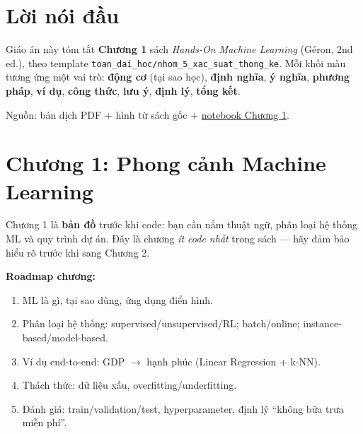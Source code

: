\documentclass[12pt,a4paper]{article}
\begin{document}

\newpage
\tableofcontents
\newpage

\section*{Lời nói đầu}

\begin{ynghia}[title={Cách đọc tài liệu}]
Giáo án này tóm tắt \textbf{Chương 1} sách \emph{Hands-On Machine Learning} (Géron, 2nd ed.), theo template \texttt{toan\_dai\_hoc/nhom\_5\_xac\_suat\_thong\_ke}. Mỗi khối màu tương ứng một vai trò: \textbf{động cơ} (tại sao học), \textbf{định nghĩa}, \textbf{ý nghĩa}, \textbf{phương pháp}, \textbf{ví dụ}, \textbf{công thức}, \textbf{lưu ý}, \textbf{định lý}, \textbf{tổng kết}.

Nguồn: bản dịch PDF + hình từ sách gốc + \href{https://github.com/ageron/handson-ml2/blob/master/01_the_machine_learning_landscape.ipynb}{notebook Chương 1}.
\end{ynghia}

\newpage

\section{Chương 1: Phong cảnh Machine Learning}

\begin{dongco}[title={Động cơ --- Chương này dạy gì?}]
Chương 1 là \textbf{bản đồ} trước khi code: bạn cần nắm thuật ngữ, phân loại hệ thống ML và quy trình dự án. Đây là chương \emph{ít code nhất} trong sách --- hãy đảm bảo hiểu rõ trước khi sang Chương 2.

\textbf{Roadmap chương:}
\begin{enumerate}
  \item ML là gì, tại sao dùng, ứng dụng điển hình.
  \item Phân loại hệ thống: supervised/unsupervised/RL; batch/online; instance-based/model-based.
  \item Ví dụ end-to-end: GDP $\to$ hạnh phúc (Linear Regression + k-NN).
  \item Thách thức: dữ liệu xấu, overfitting/underfitting.
  \item Đánh giá: train/validation/test, hyperparameter, định lý ``không bữa trưa miễn phí''.
\end{enumerate}
\end{dongco}
\end{document}
